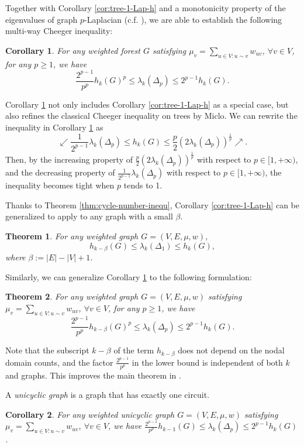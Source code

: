 \documentclass[12pt, reqno]{article}
\newtheorem{theorem}{Theorem}
\newtheorem{cor}%
{Corollary}
\begin{document}
Together with Corollary \ref{cor:tree-1-Lap-h} and a monotonicity property of the eigenvalues of graph $p$-Laplacian (c.f. \cite{Zhang}), we are able to establish the following multi-way  Cheeger inequality:

\begin{cor}\label{cor:tree-p-Lap}
For any weighted forest $G$ satisfying $\mu_v=\sum_{u\in V:u\sim v}w_{uv}$, $\forall v\in V$, for any $p\ge 1$, we have
$$\frac{2^{p-1}}{p^p}h_k(G)^p\le \lambda_{k}(\Delta_p)\le 2^{p-1} h_k(G).$$
\end{cor}

Corollary \ref{cor:tree-p-Lap} not only includes Corollary \ref{cor:tree-1-Lap-h} as a special case, but also refines the classical Cheeger inequality on trees by Miclo. 
We can rewrite the inequality in  {Corollary \ref{cor:tree-p-Lap}} as
$$
\swarrow\frac{1}{2^{p-1}}\lambda_k(\Delta_p)\le h_k(G)\le \frac p2 (2\lambda_k(\Delta_p))^{\frac1p}\nearrow.
$$
Then, by the increasing property of $\frac p2 (2\lambda_k(\Delta_p))^{\frac1p}$ with respect to $p\in[1,+\infty)$, and the decreasing property of $\frac{1}{2^{p-1}}\lambda_k(\Delta_p)$ with respect to $p\in[1,+\infty)$, the inequality becomes tight when $p$ tends to 1. 

Thanks to  {Theorem \ref{thm:cycle-number-inequ}}, {Corollary \ref{cor:tree-1-Lap-h}} can be generalized to apply to any graph with a small $\beta$.
\begin{theorem}\label{thm:beta}
For any weighted graph $G=(V,E,\mu,w)$, 
$$h_{k-\beta}(G) \le \lambda_{k}(\Delta_1)\le h_k(G),$$
where $\beta:=|E|-|V|+1$. %
\end{theorem}

Similarly, we can generalize {Corollary \ref{cor:tree-p-Lap}} to the following formulation:
\begin{theorem}\label{thm:beta-p}
For any weighted graph $G=(V,E,\mu,w)$ satisfying $\mu_v=\sum_{u\in V:u\sim v}w_{uv}$, $\forall v\in V$, for any $p\ge 1$, we have 
$$\frac{2^{p-1}}{p^p}h_{k-\beta}(G)^p\le \lambda_{k}(\Delta_p)\le 2^{p-1} h_k(G).$$
\end{theorem}

Note that the subscript $k-\beta$ of the term $h_{k-\beta}$ does not depend on the nodal domain counts, and the factor $\frac{2^{p-1}}{p^p}$ in the lower bound is independent of both $k$ and graphs. This improves the main theorem in \cite{Tudisco}. 

A \emph{unicyclic graph} is a graph that has exactly one circuit. 
\begin{cor}\label{cor:unicyclic}
For any weighted unicyclic graph $G=(V,E,\mu,w)$ satisfying $\mu_v=\sum_{u\in V:u\sim v}w_{uv}$, $\forall v\in V$, we have $\frac{2^{p-1}}{p^p}h_{k-1}(G)\le \lambda_{k}(\Delta_p)\le 2^{p-1} h_k(G)$.   
\end{cor}
\end{document}
